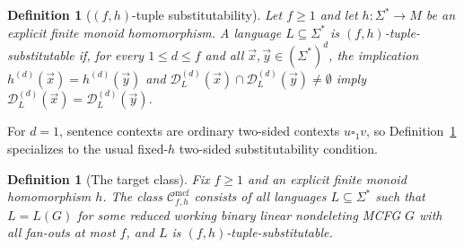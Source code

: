 \documentclass[11pt,a4paper]{article}
\newtheorem{definition}[theorem]{Definition}
\theoremstyle{remark}
\newcommand{\Cmcf}[2]{\mathcal{C}^{\mathrm{mcf}}_{#1,#2}}
\newcommand{\D}{\mathcal{D}}
\newcommand{\tuple}[1]{\vec{#1}}
\newcommand{\blank}{\square}
\begin{document}
\begin{definition}[\((f,h)\)-tuple substitutability]
\label{def:tuple-substitutable}
Let \(f\ge1\) and let \(h\colon\Sigma^*\to M\) be an explicit finite monoid
homomorphism.  A language \(L\subseteq\Sigma^*\) is
\emph{\((f,h)\)-tuple-substitutable} if, for every \(1\le d\le f\) and all
\(\tuple x,\tuple y\in(\Sigma^*)^d\), the implication
\(h^{(d)}(\tuple x)=h^{(d)}(\tuple y)\) and
\(\D_L^{(d)}(\tuple x)\cap\D_L^{(d)}(\tuple y)\ne\emptyset\) imply
\(\D_L^{(d)}(\tuple x)=\D_L^{(d)}(\tuple y)\).
\end{definition}

For \(d=1\), sentence contexts are ordinary two-sided contexts
\(u\blank_1v\), so Definition~\ref{def:tuple-substitutable} specializes to the
usual fixed-\(h\) two-sided substitutability condition.

\begin{definition}[The target class]
\label{def:class-cmcf}
Fix \(f\ge1\) and an explicit finite monoid homomorphism \(h\).  The class
\(\Cmcf{f}{h}\) consists of all languages \(L\subseteq\Sigma^*\) such that
\(L=L(G)\) for some reduced working binary linear nondeleting MCFG \(G\) with
all fan-outs at most \(f\), and \(L\) is \((f,h)\)-tuple-substitutable.
\end{definition}
\end{document}
